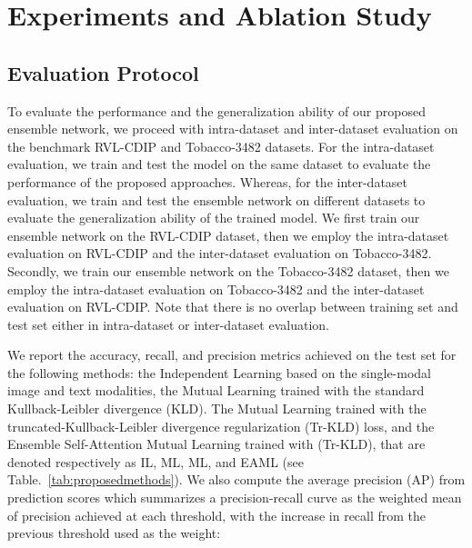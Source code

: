 \documentclass[twocolumn]{svjour3}
\begin{document}
\section{Experiments and Ablation Study}
\label{sec:Experiments and Ablation Study}

\subsection{Evaluation Protocol}

To evaluate the performance and the generalization ability of our proposed ensemble network, we proceed with intra-dataset and inter-dataset evaluation on the benchmark RVL-CDIP and Tobacco-3482 datasets. For the intra-dataset evaluation, we train and test the model on the same dataset to evaluate the performance of the proposed approaches. Whereas, for the inter-dataset evaluation, we train and test the ensemble network on different datasets to evaluate the generalization ability of the trained model. We first train our ensemble network on the RVL-CDIP dataset, then we employ the intra-dataset evaluation on RVL-CDIP and the inter-dataset evaluation on Tobacco-3482. Secondly, we train our ensemble network on the Tobacco-3482 dataset, then we employ the intra-dataset evaluation on Tobacco-3482 and the inter-dataset evaluation on RVL-CDIP. Note that there is no overlap between training set and test set either in intra-dataset or inter-dataset evaluation. 

We report the accuracy, recall, and precision metrics achieved on the test set for the following methods: the Independent Learning based on the single-modal image and text modalities, the Mutual Learning trained with the standard Kullback-Leibler divergence (KLD). The Mutual Learning trained with the truncated-Kullback-Leibler divergence regularization (Tr-KLD) loss, and the Ensemble Self-Attention Mutual Learning trained with (Tr-KLD), that are denoted respectively as IL, ML, ML, and EAML (see Table.~\ref{tab:proposedmethods}). 
We also compute the average precision (AP) from prediction scores which summarizes a precision-recall curve as the weighted mean of precision achieved at each threshold, with the increase in recall from the previous threshold used as the weight:
\end{document}
